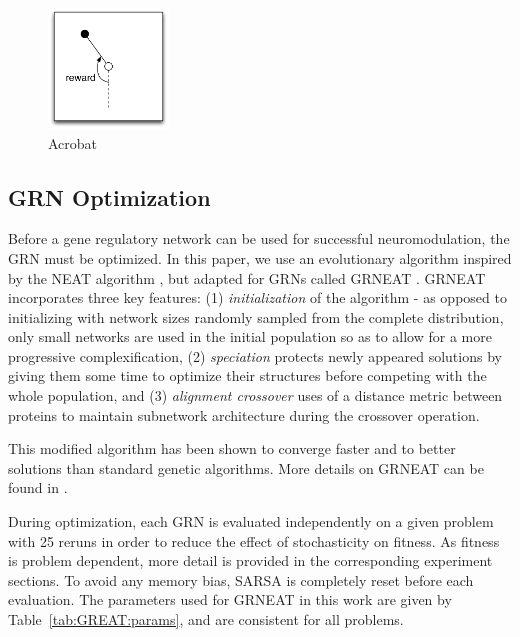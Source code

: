 \begin{figure}[ht!]
\begin{minipage}[t]{0.19\linewidth}
\center
\includegraphics[height=3.2cm]{ACP_problem.pdf}
\caption{Acrobat
}\label{fig:ACP:problem}
\end{minipage}
\end{figure}

\subsection{GRN Optimization}
Before a gene regulatory network can be used for successful neuromodulation, the GRN must be optimized. In this paper, we use an evolutionary algorithm inspired by the NEAT algorithm \cite{stanley2002evolving}, but adapted for GRNs called GRNEAT \cite{cussatblanc2015grneat}. GRNEAT incorporates three key features:
(1) \emph{initialization} of the algorithm  - as opposed to initializing with network sizes randomly sampled from the complete distribution, only small networks are used in the initial population so as to allow for a more progressive complexification,
(2) \emph{speciation} protects newly appeared solutions by giving them some time to optimize their structures before competing with the whole population, and
(3) \emph{alignment crossover} uses of a distance metric between proteins to maintain subnetwork architecture during the crossover operation.

This modified algorithm has been shown to converge faster and to better solutions than standard genetic algorithms. More details on GRNEAT can be found in \cite{cussatblanc2015grneat}.

During optimization, each GRN is evaluated independently on a given problem with 25 reruns in order to reduce the effect of stochasticity on fitness. As fitness is problem dependent, more detail is provided in the corresponding experiment sections. To avoid any memory bias, SARSA is completely reset before each evaluation. The parameters used for GRNEAT in this work are given by Table~\ref{tab:GREAT:params}, and are consistent for all problems. 

